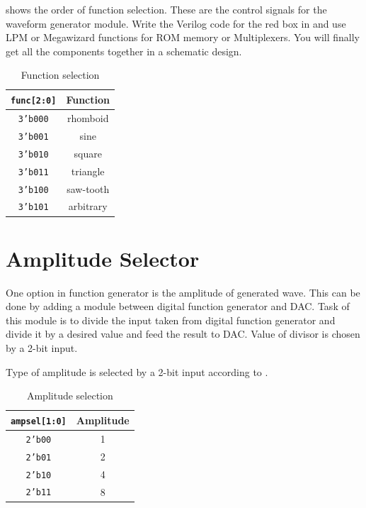 \documentclass[12pt, logo=tehranDLDL/ut]{tehranDLDL}
\begin{document}
 shows the order of function selection. These are the control signals for the waveform generator module.
Write the Verilog code for the red box in  and use LPM or Megawizard functions for ROM memory or Multiplexers.
You will finally get all the components together in a schematic design.

\begin{table}[t]
    \centering
    \caption{Function selection\label{tab:funcsel}}
    \begin{tabular}{c c}
        \texttt{func[2:0]} & Function\\
        \hline
        \texttt{3'b000} & rhomboid\\
        \texttt{3'b001} & sine\\
        \texttt{3'b010} & square\\
        \texttt{3'b011} & triangle\\
        \texttt{3'b100} & saw-tooth\\
        \texttt{3'b101} & arbitrary
    \end{tabular}
\end{table}

\designverification{}

\section{Amplitude Selector}

One option in function generator is the amplitude of generated wave. This can be done by adding a module between digital function generator and DAC. Task of this module is to divide the input taken from digital function generator and divide it by a desired value and feed the result to DAC. Value of divisor is chosen by a 2-bit input.

Type of amplitude is selected by a 2-bit input according to .
\begin{table}[b]
    \centering
    \caption{Amplitude selection\label{tab:ampsel}}
    \begin{tabular}{c c}
        \texttt{ampsel[1:0]} & Amplitude\\
        \hline
        \texttt{2'b00} & 1\\
        \texttt{2'b01} & 2\\
        \texttt{2'b10} & 4\\
        \texttt{2'b11} & 8
    \end{tabular}
\end{table}
\end{document}
